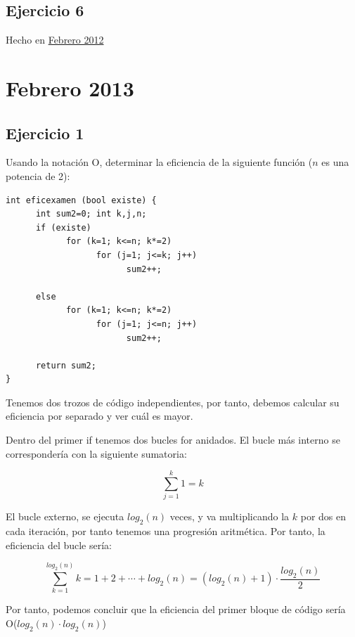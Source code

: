 \documentclass[10pt,a4paper,spanish]{report}
\begin{document}
\subsection{\textcolor[rgb]{0.5,0.8,1}Ejercicio 6}
\noindent
Hecho en \hyperref[avl_feb2013]{Febrero 2012}

\section{\textcolor[rgb]{0.5,0.8,1}Febrero 2013}
\subsection{\textcolor[rgb]{0.5,0.8,1}Ejercicio 1}
\noindent
Usando la notación O, determinar la eficiencia de la siguiente función ($n$ es una potencia de 2):

\begin{verbatim}
int eficexamen (bool existe) {
      int sum2=0; int k,j,n;
      if (existe)
            for (k=1; k<=n; k*=2)
                  for (j=1; j<=k; j++)
                        sum2++;

      else
            for (k=1; k<=n; k*=2)
                  for (j=1; j<=n; j++)
                        sum2++;

      return sum2;
}
\end{verbatim}

\noindent
Tenemos dos trozos de código independientes, por tanto, debemos calcular su eficiencia por separado y ver cuál es mayor.

\noindent
Dentro del primer if tenemos dos bucles for anidados. El bucle más interno se correspondería con la siguiente sumatoria:

\begin{displaymath}
\sum_{j=1}^k 1 = k
\end{displaymath}

\noindent
El bucle externo, se ejecuta $log_2 (n)$ veces, y va multiplicando la $k$ por dos en cada iteración, por tanto tenemos una progresión aritmética. Por tanto, la eficiencia del bucle sería:

\begin{displaymath}
\sum_{k=1}^{log_2 (n)} k = 1 + 2 + \cdots + log_2 (n) = (log_2 (n) + 1) \cdot \frac{log_2 (n)}{2}
\end{displaymath}

\noindent
Por tanto, podemos concluir que la eficiencia del primer bloque de código sería O($log_2 (n) \cdot log_2(n)$)
\end{document}
